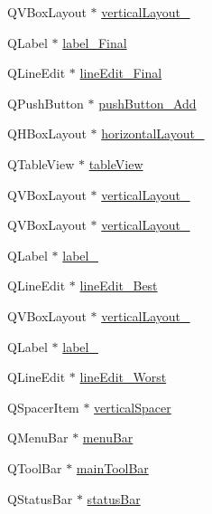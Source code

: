 \begin{DoxyCompactItemize}
\item 
Q\+V\+Box\+Layout $\ast$ \hyperlink{class_ui___main_window_aaa8cc393d5a44562d629a9f646d2c6dd}{vertical\+Layout\+\_}
\item 
Q\+Label $\ast$ \hyperlink{class_ui___main_window_a5a5a49163b5063282ddaf88d2355c30e}{label\+\_\+\+Final}
\item 
Q\+Line\+Edit $\ast$ \hyperlink{class_ui___main_window_a68c792ffc68e4780df20fc5f8b53691b}{line\+Edit\+\_\+\+Final}
\item 
Q\+Push\+Button $\ast$ \hyperlink{class_ui___main_window_a777806fd64c2c8374a96d93416bb6755}{push\+Button\+\_\+\+Add}
\item 
Q\+H\+Box\+Layout $\ast$ \hyperlink{class_ui___main_window_a80867018070156432923d0266cc9fe25}{horizontal\+Layout\+\_}
\item 
Q\+Table\+View $\ast$ \hyperlink{class_ui___main_window_a3f4332a5b5e82f676f25ec3148c1c83c}{table\+View}
\item 
Q\+V\+Box\+Layout $\ast$ \hyperlink{class_ui___main_window_a7b66d5d6ab55f3977317359d09a42345}{vertical\+Layout\+\_}
\item 
Q\+V\+Box\+Layout $\ast$ \hyperlink{class_ui___main_window_afcc20a3d5058037a00cdc6122f231848}{vertical\+Layout\+\_}
\item 
Q\+Label $\ast$ \hyperlink{class_ui___main_window_ad6bab8fb8903b8f41afea1218ee52695}{label\+\_}
\item 
Q\+Line\+Edit $\ast$ \hyperlink{class_ui___main_window_acc9b644029ca428aaa02f51987ab916c}{line\+Edit\+\_\+\+Best}
\item 
Q\+V\+Box\+Layout $\ast$ \hyperlink{class_ui___main_window_a93c190b085c63a667c535ba0bbcfec7c}{vertical\+Layout\+\_}
\item 
Q\+Label $\ast$ \hyperlink{class_ui___main_window_a663f728e6244926a795c6e6892673b1d}{label\+\_}
\item 
Q\+Line\+Edit $\ast$ \hyperlink{class_ui___main_window_ae181778daaff9344ee25e9cf388310f6}{line\+Edit\+\_\+\+Worst}
\item 
Q\+Spacer\+Item $\ast$ \hyperlink{class_ui___main_window_a8384329c3663ff274e926a12024aab52}{vertical\+Spacer}
\item 
Q\+Menu\+Bar $\ast$ \hyperlink{class_ui___main_window_a2be1c24ec9adfca18e1dcc951931457f}{menu\+Bar}
\item 
Q\+Tool\+Bar $\ast$ \hyperlink{class_ui___main_window_a5172877001c8c7b4e0f6de50421867d1}{main\+Tool\+Bar}
\item 
Q\+Status\+Bar $\ast$ \hyperlink{class_ui___main_window_a50fa481337604bcc8bf68de18ab16ecd}{status\+Bar}
\end{DoxyCompactItemize}


